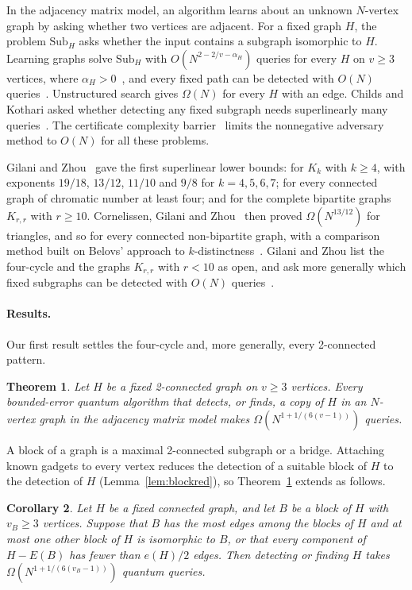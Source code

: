 \documentclass[11pt]{article}
\newtheorem{theorem}{Theorem}[section]
\newtheorem{corollary}[theorem]{Corollary}
\theoremstyle{remark}
\newcommand{\Sub}{\mathrm{Sub}}
\begin{document}
In the adjacency matrix model, an algorithm learns about an unknown $N$-vertex graph by asking whether two vertices are adjacent. For a fixed graph $H$, the problem $\Sub_H$ asks whether the input contains a subgraph isomorphic to $H$. Learning graphs solve $\Sub_H$ with $O(N^{2-2/v-\alpha_H})$ queries for every $H$ on $v\ge3$ vertices, where $\alpha_H>0$~\cite{LMS12,Zhu12}, and every fixed path can be detected with $O(N)$ queries~\cite{BR12}. Unstructured search gives $\Omega(N)$ for every $H$ with an edge. Childs and Kothari asked whether detecting any fixed subgraph needs superlinearly many queries~\cite[Section~5]{CK11}. The certificate complexity barrier~\cite{SS06,Zha04} limits the nonnegative adversary method to $O(N)$ for all these problems.

Gilani and Zhou~\cite{GZ26} gave the first superlinear lower bounds: for $K_k$ with $k\ge4$, with exponents $19/18$, $13/12$, $11/10$ and $9/8$ for $k=4,5,6,7$; for every connected graph of chromatic number at least four; and for the complete bipartite graphs $K_{r,r}$ with $r\ge10$. Cornelissen, Gilani and Zhou~\cite{CGZ26} then proved $\Omega(N^{13/12})$ for triangles, and so for every connected non-bipartite graph, with a comparison method built on Belovs' approach to $k$-distinctness~\cite{Bel26}. Gilani and Zhou list the four-cycle and the graphs $K_{r,r}$ with $r<10$ as open, and ask more generally which fixed subgraphs can be detected with $O(N)$ queries~\cite[Section~1.4]{GZ26}.

\paragraph{Results.} Our first result settles the four-cycle and, more generally, every 2-connected pattern.

\begin{theorem}\label{thm:2conn}
Let $H$ be a fixed 2-connected graph on $v\ge3$ vertices. Every bounded-error quantum algorithm that detects, or finds, a copy of $H$ in an $N$-vertex graph in the adjacency matrix model makes $\Omega(N^{1+1/(6(v-1))})$ queries.
\end{theorem}

A block of a graph is a maximal 2-connected subgraph or a bridge. Attaching known gadgets to every vertex reduces the detection of a suitable block of $H$ to the detection of $H$ (Lemma~\ref{lem:blockred}), so Theorem~\ref{thm:2conn} extends as follows.

\begin{corollary}\label{cor:core}
Let $H$ be a fixed connected graph, and let $B$ be a block of $H$ with $v_B\ge3$ vertices. Suppose that $B$ has the most edges among the blocks of $H$ and at most one other block of $H$ is isomorphic to $B$, or that every component of $H-E(B)$ has fewer than $e(H)/2$ edges. Then detecting or finding $H$ takes $\Omega(N^{1+1/(6(v_B-1))})$ quantum queries.
\end{corollary}
\end{document}
